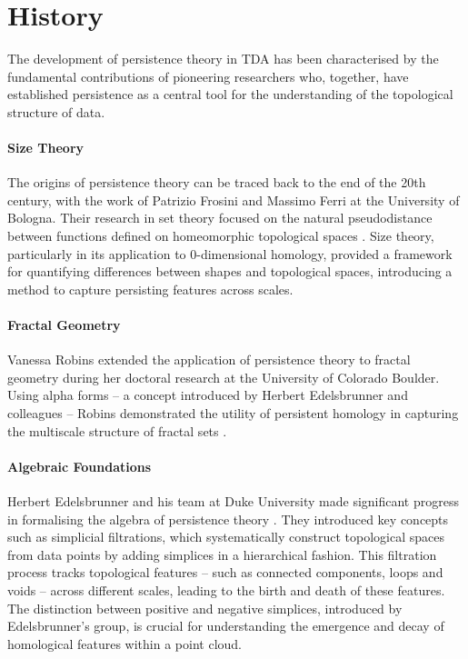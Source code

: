 \section{History}
The development of persistence theory in TDA has been characterised by the fundamental contributions of pioneering researchers who, together, have established persistence as a central tool for the understanding of the topological structure of data.

\paragraph*{Size Theory}
The origins of persistence theory can be traced back to the end of the 20th century, with the work of Patrizio Frosini and Massimo Ferri at the University of Bologna. Their research in set theory focused on the natural pseudodistance between functions defined on homeomorphic topological spaces \cite{Frosini1999,Ferri1998}. Size theory, particularly in its application to $0$-dimensional homology, provided a framework for quantifying differences between shapes and topological spaces, introducing a method to capture persisting features across scales.

\paragraph*{Fractal Geometry}
Vanessa Robins extended the application of persistence theory to fractal geometry during her doctoral research at the University of Colorado Boulder. Using alpha forms -- a concept introduced by Herbert Edelsbrunner and colleagues -- Robins demonstrated the utility of persistent homology in capturing the multiscale structure of fractal sets \cite{Robins2000, Edelsbrunner1994}.

\paragraph*{Algebraic Foundations}
Herbert Edelsbrunner and his team at Duke University made significant progress in formalising the algebra of persistence theory \cite{Edelsbrunner2000}. They introduced key concepts such as simplicial filtrations, which systematically construct topological spaces from data points by adding simplices in a hierarchical fashion. This filtration process tracks topological features -- such as connected components, loops and voids -- across different scales, leading to the birth and death of these features. The distinction between positive and negative simplices, introduced by Edelsbrunner's group, is crucial for understanding the emergence and decay of homological features within a point cloud. 

